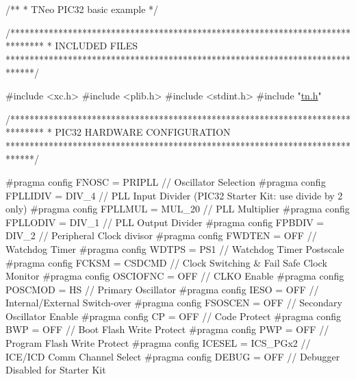\begin{DoxyCodeInclude}
\textcolor{comment}{/**}
\textcolor{comment}{ * TNeo PIC32 basic example}
\textcolor{comment}{ */}

\textcolor{comment}{/*******************************************************************************}
\textcolor{comment}{ *    INCLUDED FILES}
\textcolor{comment}{ ******************************************************************************/}

\textcolor{preprocessor}{#include <xc.h>}
\textcolor{preprocessor}{#include <plib.h>}
\textcolor{preprocessor}{#include <stdint.h>}
\textcolor{preprocessor}{#include "\hyperlink{tn_8h}{tn.h}"}




\textcolor{comment}{/*******************************************************************************}
\textcolor{comment}{ *    PIC32 HARDWARE CONFIGURATION}
\textcolor{comment}{ ******************************************************************************/}

\textcolor{preprocessor}{#pragma config FNOSC    = PRIPLL        // Oscillator Selection}
\textcolor{preprocessor}{#pragma config FPLLIDIV = DIV\_4         // PLL Input Divider (PIC32 Starter Kit: use divide by 2 only)}
\textcolor{preprocessor}{#pragma config FPLLMUL  = MUL\_20        // PLL Multiplier}
\textcolor{preprocessor}{#pragma config FPLLODIV = DIV\_1         // PLL Output Divider}
\textcolor{preprocessor}{#pragma config FPBDIV   = DIV\_2         // Peripheral Clock divisor}
\textcolor{preprocessor}{#pragma config FWDTEN   = OFF           // Watchdog Timer}
\textcolor{preprocessor}{#pragma config WDTPS    = PS1           // Watchdog Timer Postscale}
\textcolor{preprocessor}{#pragma config FCKSM    = CSDCMD        // Clock Switching & Fail Safe Clock Monitor}
\textcolor{preprocessor}{#pragma config OSCIOFNC = OFF           // CLKO Enable}
\textcolor{preprocessor}{#pragma config POSCMOD  = HS            // Primary Oscillator}
\textcolor{preprocessor}{#pragma config IESO     = OFF           // Internal/External Switch-over}
\textcolor{preprocessor}{#pragma config FSOSCEN  = OFF           // Secondary Oscillator Enable}
\textcolor{preprocessor}{#pragma config CP       = OFF           // Code Protect}
\textcolor{preprocessor}{#pragma config BWP      = OFF           // Boot Flash Write Protect}
\textcolor{preprocessor}{#pragma config PWP      = OFF           // Program Flash Write Protect}
\textcolor{preprocessor}{#pragma config ICESEL   = ICS\_PGx2      // ICE/ICD Comm Channel Select}
\textcolor{preprocessor}{#pragma config DEBUG    = OFF           // Debugger Disabled for Starter Kit}





\end{DoxyCodeInclude}
